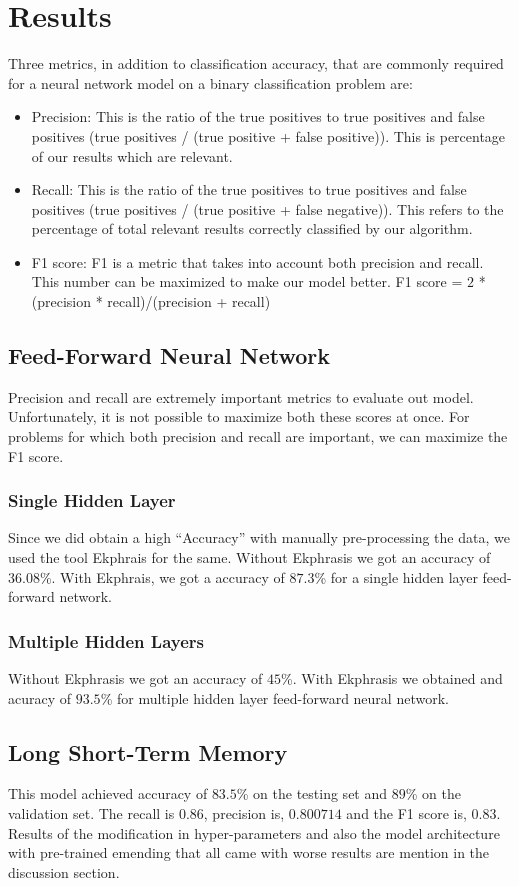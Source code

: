 \section{Results}
\label{sec:results}
Three metrics, in addition to classification accuracy, that are commonly required for a neural network model on a binary classification problem are:
\begin{itemize}
\item Precision: This is the ratio of the true positives to true positives and false positives (true positives / (true positive + false positive)). This is percentage of our results which are relevant.
\item Recall: This is the ratio of the true positives to true positives and false positives (true positives / (true positive + false negative)). This refers to the percentage of total relevant results correctly classified by our algorithm.
\item F1 score: F1 is a metric that takes into account both precision and recall. This number can be maximized to make our model better. F1 score = $2$ *(precision * recall)/(precision + recall)
\end{itemize}
\subsection{Feed-Forward Neural Network}
Precision and recall are extremely important metrics to evaluate out model. Unfortunately, it is not possible to maximize both these scores at once. For problems for which both precision and recall are important, we can maximize the F1 score.

\subsubsection{Single Hidden Layer} Since we did obtain a high ``Accuracy'' with manually pre-processing the data, we used the tool Ekphrais for the same. Without Ekphrasis we got an accuracy of $36.08$\%. With Ekphrais, we got a accuracy of $87.3$\% for a single hidden layer feed-forward network.

\subsubsection{Multiple Hidden Layers} Without Ekphrasis we got an accuracy of $45$\%. With Ekphrasis we obtained and acuracy of $93.5$\% for multiple hidden layer
feed-forward neural network.

\subsection{Long Short-Term Memory}
This model achieved accuracy of $83.5$\% on the testing set and $89$\% on the validation set. The recall is  $0.86$, precision is, $0.800714$ and the F1 score is, $0.83$. Results of the modification in hyper-parameters and also the model architecture with pre-trained emending that all came with worse results are mention in the discussion section. 
